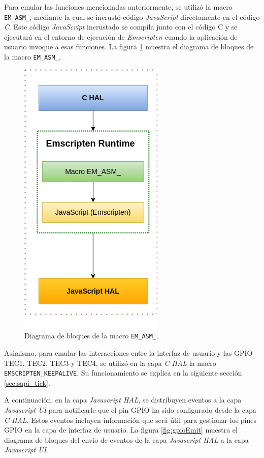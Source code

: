 Para emular las funciones mencionadas anteriormente, se utilizó la macro \newline \texttt{EM\_ASM\_}, mediante la cual se incrustó código \textit{JavaScript} directamente en el código \textit{C}. Este código \textit{JavaScript} incrustado se compila junto con el código C y se ejecutará en el entorno de ejecución de \textit{Emscripten}  cuando la aplicación de usuario invoque a esas funciones. La figura \ref{fig:gpioEmscripten} muestra el diagrama de bloques de la macro \texttt{EM\_ASM\_}.

\hfill \break


\begin{figure}[ht]
	\centering
	\includegraphics[scale=.40]{./Figures/gpioEmscripten.png}
	\caption{Diagrama de bloques de la macro \texttt{EM\_ASM\_}.}
	\label{fig:gpioEmscripten}
\end{figure}


Asimismo, para emular las interacciones entre la interfaz de usuario y las GPIO TEC1, TEC2, TEC3 y TEC4, se utilizó en la capa \textit{C HAL} la macro \newline \texttt{EMSCRIPTEN\_KEEPALIVE}. Su funcionamiento se explica en la siguiente sección \ref{sec:sapi_tick}. 

A continuación, en la capa \textit{Javascript HAL}, se distribuyen eventos a la capa \textit{Javascript UI} para notificarle que el pin GPIO ha sido configurado desde la capa \textit{C HAL}. Estos eventos incluyen información que será útil para gestionar los pines GPIO en la capa de interfaz de usuario. La figura \ref{fig:gpioEmit} muestra el diagrama de bloques del envío de eventos de la capa \textit{Javascript HAL} a la capa \textit{Javascript UI}.

